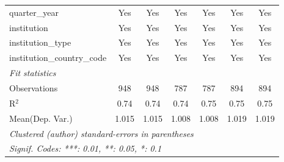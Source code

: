 \begin{tabular}{lcccccc}
   quarter\_year                      & Yes     & Yes     & Yes     & Yes     & Yes     & Yes\\  
   institution                        & Yes     & Yes     & Yes     & Yes     & Yes     & Yes\\  
   institution\_type                  & Yes     & Yes     & Yes     & Yes     & Yes     & Yes\\  
   institution\_country\_code         & Yes     & Yes     & Yes     & Yes     & Yes     & Yes\\  
   \midrule
   \emph{Fit statistics}\\
   Observations                       & 948     & 948     & 787     & 787     & 894     & 894\\  
   R$^2$                              & 0.74    & 0.74    & 0.74    & 0.75    & 0.75    & 0.75\\  
Mean(Dep. Var.) & 1.015 & 1.015 & 1.008 & 1.008 & 1.019 & 1.019 \\
   \midrule \midrule
   \multicolumn{7}{l}{\emph{Clustered (author) standard-errors in parentheses}}\\
   \multicolumn{7}{l}{\emph{Signif. Codes: ***: 0.01, **: 0.05, *: 0.1}}\\
\end{tabular}
\par\endgroup
